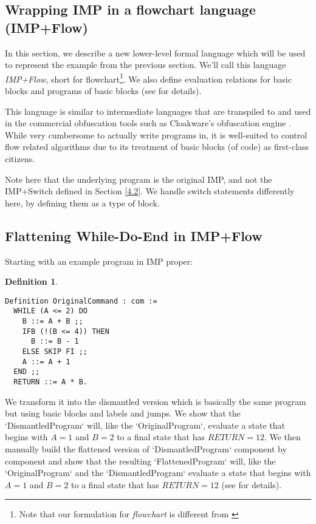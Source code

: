 \documentclass[compsoc,conference,a4paper,10pt,times]{IEEEtran}
\newtheorem{defin}[theorem]{Definition}
\begin{document}
\subsection{Wrapping IMP in a flowchart language (IMP+Flow)}

In this section, we describe a new lower-level formal language which will be used to represent the example from the previous section.  We'll call this language \emph{IMP+Flow}, short for flowchart\footnote{Note that our formulation for \emph{flowchart} is different from \cite{SFV2}}. We also define evaluation relations for basic blocks and programs of basic blocks (see \cite{Weyun} for details).

\par This language is similar to intermediate languages that are transpiled to and used in the commercial obfuscation tools such as Cloakware's obfuscation engine \cite{Cloakware}. While very cumbersome to actually write programs in, it is well-suited to control flow related algorithms due to its treatment of basic blocks (of code) as first-class citizens.

\par Note here that the underlying program is the original IMP, and not the IMP+Switch defined in Section \ref{4.2}.  We handle switch statements differently here, by defining them as a type of block.

\subsection{Flattening While-Do-End in IMP+Flow}

Starting with an example program in IMP proper:

\begin{defin}
    
    \begin{verbatim}
Definition OriginalCommand : com :=
  WHILE (A <= 2) DO
    B ::= A + B ;;
    IFB (!(B <= 4)) THEN
      B ::= B - 1
    ELSE SKIP FI ;;
    A ::= A + 1
  END ;;
  RETURN ::= A * B.
  \end{verbatim}
  \end{defin}

We transform it into the dismantled version which is basically the same program but using basic blocks and labels and jumps. We show that the `DismantledProgram` will, like the `OriginalProgram`, evaluate a state that begins with $A = 1$ and $B = 2$ to a final state that has $RETURN = 12$. We then manually build the flattened version of `DismantledProgram` component by component and show that the resulting `FlattenedProgram` will, like the `OriginalProgram` and the `DismantledProgram` evaluate a state that begins with $A = 1$ and $B = 2$ to a final state that has $RETURN = 12$ (see \cite{Weyun} for details).
\end{document}
